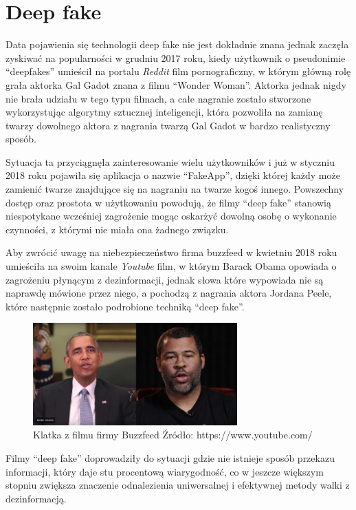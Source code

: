 \section{Deep fake}

Data pojawienia się technologii deep fake nie jest dokładnie znana jednak zaczęła zyskiwać na popularności 
w grudniu 2017 roku, kiedy użytkownik o pseudonimie ``deepfakes'' umieścił na portalu \emph{Reddit} film
pornograficzny, w którym główną rolę grała aktorka Gal Gadot znana z filmu ``Wonder Woman''. Aktorka jednak 
nigdy nie brała udziału w tego typu filmach, a całe nagranie zostało stworzone wykorzystując algorytmy sztucznej
inteligencji, która pozwoliła na zamianę twarzy dowolnego aktora z nagrania twarzą Gal Gadot w bardzo realistyczny sposób.

Sytuacja ta przyciągnęła zainteresowanie wielu użytkowników i już w styczniu 2018 roku pojawiła się aplikacja o nazwie
``FakeApp'', dzięki której każdy może zamienić twarze znajdujące się na nagraniu na twarze kogoś innego.
Powszechny dostęp oraz prostota w użytkowaniu powodują, że filmy ``deep fake'' stanowią niespotykane wcześniej zagrożenie
mogąc oskarżyć dowolną osobę o wykonanie czynności, z którymi nie miała ona żadnego związku. 

Aby zwrócić uwagę na niebezpieczeństwo firma buzzfeed w kwietniu 2018 roku umieściła na swoim kanale \emph{Youtube} film, w którym Barack Obama opowiada 
o zagrożeniu płynącym z dezinformacji, jednak słowa które wypowiada nie są naprawdę mówione przez niego, a pochodzą
z nagrania aktora Jordana Peele, które następnie zostało podrobione techniką ``deep fake''.

\begin{figure}[h!]
    \centering
    \includegraphics[width=0.7\textwidth]{./Img/peele.jpg}
    \caption{Klatka z filmu firmy Buzzfeed Źródło: https://www.youtube.com/}
\end{figure}

Filmy ``deep fake'' doprowadziły do sytuacji gdzie nie istnieje sposób przekazu informacji, który daje stu procentową wiarygodność,
co w jeszcze większym stopniu zwiększa znaczenie odnalezienia uniwersalnej i efektywnej metody walki z dezinformacją. 